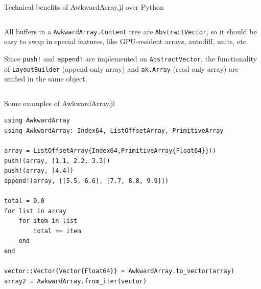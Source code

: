 \documentclass[aspectratio=169]{beamer}
\begin{document}
\begin{frame}{Technical benefits of AwkwardArray.jl over Python}
\large
\vspace{0.3 cm}
\begin{columns}

\begin{description}\setlength{\itemsep}{0.5 cm}
\item<1->[\bf Composability:] All buffers in a \texttt{AwkwardArray.Content} tree are \texttt{AbstractVector}, so it should be easy to swap in special features, like GPU-resident arrays, autodiff, units, etc.

\vspace{0.25 cm}

\item<3->[\bf Unification:] Since \texttt{push!} and \texttt{append!} are implemented on \texttt{AbstractVector}, the functionality of \texttt{LayoutBuilder} (append-only array) and \texttt{ak.Array} (read-only array) are unified in the same object.

\vspace{0.25 cm}
\end{description}
\end{columns}
\end{frame}

\begin{frame}[fragile]{Some examples of AwkwardArray.jl}
\small
\vspace{0.25 cm}
\begin{verbatim}
using AwkwardArray
using AwkwardArray: Index64, ListOffsetArray, PrimitiveArray

array = ListOffsetArray{Index64,PrimitiveArray{Float64}}()
push!(array, [1.1, 2.2, 3.3])
push!(array, [4.4])
append!(array, [[5.5, 6.6], [7.7, 8.8, 9.9]])

total = 0.0
for list in array
    for item in list
        total += item
    end
end

vector::Vector{Vector{Float64}} = AwkwardArray.to_vector(array)
array2 = AwkwardArray.from_iter(vector)
\end{verbatim}
\end{frame}
\end{document}
